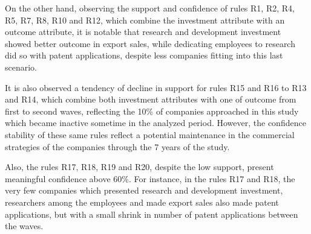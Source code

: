 \documentclass[a4paper,twoside]{article}
\begin{document}
On the other hand, observing the support and confidence of rules R1, R2, R4, R5, R7, R8, R10 and R12, which combine the investment attribute with an outcome attribute, it is notable that research and development investment showed better outcome in export sales, while dedicating employees to research did so with patent applications, despite less companies fitting into this last scenario.

It is also observed a tendency of decline in support for rules R15 and R16 to R13 and R14, which combine both investment attributes with one of outcome from first to second waves, reflecting the 10\% of companies approached in this study which became inactive sometime in the analyzed period. However, the confidence stability of these same rules reflect a potential maintenance in the commercial strategies of the companies through the 7 years of the study.

Also, the rules R17, R18, R19 and R20, despite the low support, present meaningful confidence above 60\%. For instance, in the rules R17 and R18, the very few companies which presented research and development investment, researchers among the employees and made export sales also made patent applications, but with a small shrink in number of patent applications between the waves.
\end{document}
